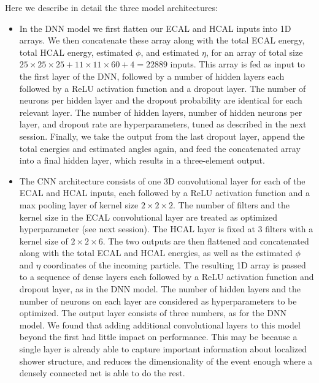 Here we describe in detail the three model architectures:

\begin{itemize}
    \item In the DNN model we first flatten our ECAL and HCAL inputs into 1D arrays. We then concatenate these array along with the total ECAL energy, total HCAL energy, estimated $\phi$, and estimated $\eta$, for an array of total size $25 \times 25 \times 25 + 11 \times 11 \times 60 + 4 = 22889$ inputs. This array is fed as input to the first layer of the DNN, followed by a number of hidden layers each followed by a ReLU activation function and a dropout layer. The number of neurons per hidden layer and the dropout probability are identical for each relevant layer. The number of hidden layers, number of hidden neurons per layer, and dropout rate are hyperparameters, tuned as described in the next session.  Finally, we take the output from the last dropout layer, append the total energies and estimated angles again, and feed the concatenated array into a final hidden layer, which results in a three-element output. 
    \item The CNN architecture consists of one 3D convolutional layer for each of the ECAL and HCAL inputs, each followed by a ReLU activation function and a max pooling layer of kernel size $2 \times 2 \times 2$. The number of filters and the kernel size in the ECAL convolutional layer are treated as optimized hyperparameter (see next session). The HCAL layer is fixed at 3 filters with a kernel size of $2 \times 2 \times 6$. The two outputs are then flattened and concatenated along with the total ECAL and HCAL energies, as well as the estimated $\phi$ and $\eta$ coordinates of the incoming particle. The resulting 1D array is passed to a sequence of dense layers each followed by a ReLU activation function and dropout layer, as in the DNN model. The number of hidden layers and the number of neurons on each layer are considered as hyperparameters to be optimized. The output layer consists of three numbers, as for the DNN model. We found that adding additional convolutional layers to this model beyond the first had little impact on performance. This may be because a single layer is already able to capture important information about localized shower structure, and reduces the dimensionality of the event enough where a densely connected net is able to do the rest.

\end{itemize}
